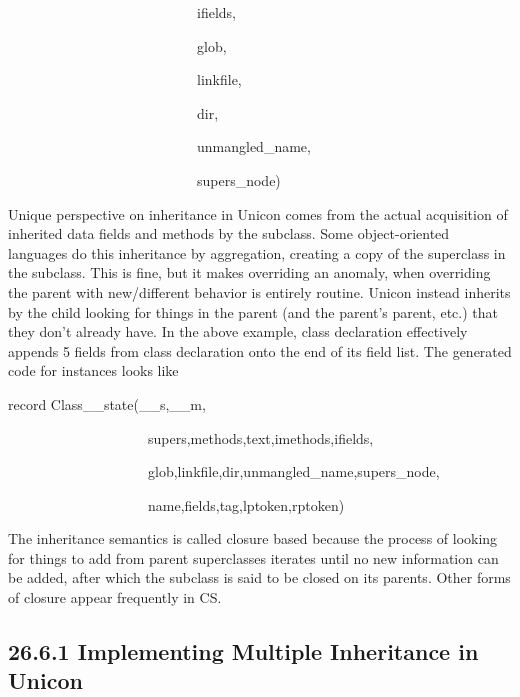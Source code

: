 {\ttfamily\mdseries
\ \ \ \ \ \ \ \ \ \ \ \ \ \ \ \ \ \ \ \ \ \ \ \ \ \ \ ifields,}

{\ttfamily\mdseries
\ \ \ \ \ \ \ \ \ \ \ \ \ \ \ \ \ \ \ \ \ \ \ \ \ \ \ glob,}

{\ttfamily\mdseries
\ \ \ \ \ \ \ \ \ \ \ \ \ \ \ \ \ \ \ \ \ \ \ \ \ \ \ linkfile,}

{\ttfamily\mdseries
\ \ \ \ \ \ \ \ \ \ \ \ \ \ \ \ \ \ \ \ \ \ \ \ \ \ \ dir,}

{\ttfamily\mdseries
\ \ \ \ \ \ \ \ \ \ \ \ \ \ \ \ \ \ \ \ \ \ \ \ \ \ \ unmangled\_name,}

{\ttfamily\mdseries
\ \ \ \ \ \ \ \ \ \ \ \ \ \ \ \ \ \ \ \ \ \ \ \ \ \ \ supers\_node)}


Unique perspective on inheritance in Unicon comes from the actual
acquisition of inherited data fields and methods by the subclass. Some
object-oriented languages do this inheritance {\textquotedbl}by
aggregation{\textquotedbl}, creating a copy of the superclass in the
subclass. This is fine, but it makes
{\textquotedbl}overriding{\textquotedbl} an anomaly, when overriding
the parent with new/different behavior is entirely routine. Unicon
instead inherits by the child looking for things in the parent (and
the parent's parent, etc.) that they don't already have. In the above
example, class declaration effectively appends 5 fields from class
declaration onto the end of its field list. The generated code for
instances looks like

{\ttfamily\mdseries
record Class\_\_state(\_\_s,\_\_m,}

{\ttfamily\mdseries
\ \ \ \ \ \ \ \ \ \ \ \ \ \ \ \ \ \ \ \ supers,methods,text,imethods,ifields,}

{\ttfamily\mdseries
\ \ \ \ \ \ \ \ \ \ \ \ \ \ \ \ \ \ \ \ glob,linkfile,dir,unmangled\_name,supers\_node,}

{\ttfamily\mdseries
\ \ \ \ \ \ \ \ \ \ \ \ \ \ \ \ \ \ \ \ name,fields,tag,lptoken,rptoken)}

The inheritance semantics is called {\textquotedbl}closure
based{\textquotedbl} because the process of looking for things to add
from parent superclasses iterates until no new information can be
added, after which the subclass is said to be closed on its
parents. Other forms of closure appear frequently in CS.

\subsection[26.6.1 Implementing Multiple Inheritance in Unicon]{26.6.1 Implementing Multiple Inheritance in Unicon}

